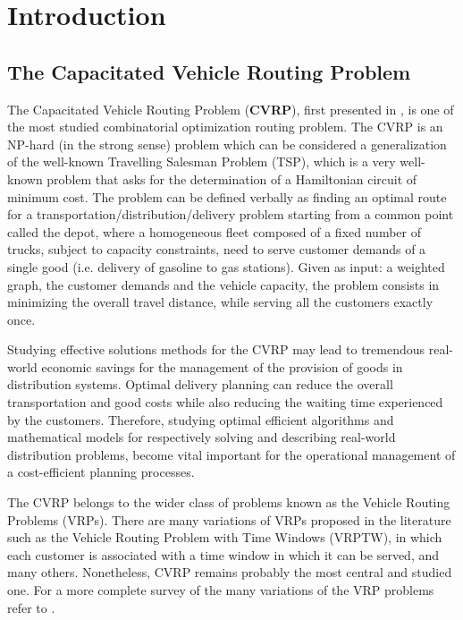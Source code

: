 \chapter{Introduction}
\label{sec:introduction-chapter}

\section{The Capacitated Vehicle Routing Problem}
\label{sec:intro-cvrp-problem}

The Capacitated Vehicle Routing Problem (\textbf{CVRP}), first presented in \textcite{dantzig1959},
is one of the most studied combinatorial optimization routing problem.
The CVRP is an NP-hard (in the strong sense) problem which can be considered a generalization
of the well-known Travelling Salesman Problem (TSP),
which is a very well-known problem that asks for the determination
of a Hamiltonian circuit of minimum cost.
The problem can be defined verbally as finding an optimal route for a transportation/distribution/delivery problem
starting from a common point called the depot,
where a homogeneous fleet composed of a fixed number of trucks, subject to capacity constraints,
need to serve customer demands of a single good (i.e. delivery of gasoline to gas stations).
Given as input: a weighted graph, the customer demands and the vehicle capacity,
the problem consists in minimizing the overall travel distance,
while serving all the customers exactly once.

Studying effective solutions methods for the CVRP may lead to tremendous real-world economic
savings for the management of the provision of goods in distribution systems.
Optimal delivery planning can reduce the overall transportation and good costs while
also reducing the waiting time experienced by the customers.
Therefore, studying optimal efficient algorithms and mathematical models for
respectively solving and describing real-world distribution problems, become vital
important for the operational management of a cost-efficient planning processes.

The CVRP belongs to the wider class of problems known as the Vehicle Routing Problems (VRPs).
There are many variations of VRPs proposed in the literature such as
the Vehicle Routing Problem with Time Windows (VRPTW), in which
each customer is associated with a time window in which it can be served,
and many others.
Nonetheless, CVRP remains probably the most central and studied one.
For a more complete survey of the many variations of the VRP problems refer to \cite{toth2014}.

